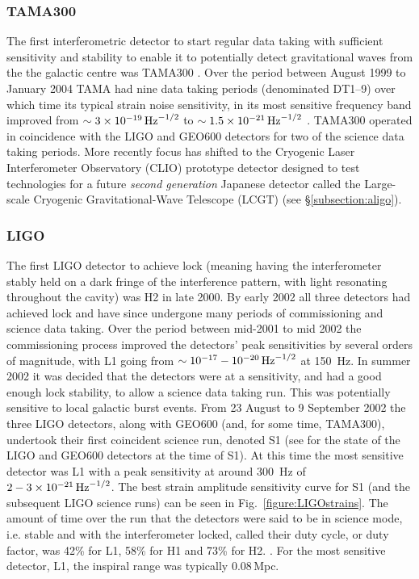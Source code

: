 \documentclass{article}
\begin{document}
\subsubsection{TAMA300}
The first interferometric detector to start regular data taking with sufficient
sensitivity and stability to enable it to potentially detect gravitational waves
from the the galactic centre was TAMA300 \cite{Ando:2001}. Over the period
between August 1999 to January 2004 TAMA had nine data taking periods
(denominated DT1--9) over which time its typical strain noise sensitivity, in
its most sensitive frequency band improved from $\sim3\times10^{-19}\,{\rm
Hz}^{-1/2}$ to $\sim1.5\times10^{-21}\,{\rm Hz}^{-1/2}$ \cite{Akutsu:2006}.
TAMA300 operated in coincidence with the LIGO and GEO600 detectors for two of
the science data taking periods. More recently focus has shifted to the
Cryogenic Laser Interferometer Observatory (CLIO) prototype detector
\cite{Yamamoto:2008, CLIOweb} designed to test technologies for a future {\it
second generation} Japanese detector called the Large-scale Cryogenic
Gravitational-Wave Telescope (LCGT) (see \S\ref{subsection:aligo}).

\subsubsection{LIGO}\label{sec:ligoruns}
The first LIGO detector to achieve lock (meaning having the interferometer
stably held on a dark fringe of the interference pattern, with light resonating
throughout the cavity) was H2 in late 2000. By early 2002 all three detectors
had achieved lock and have since undergone many periods of commissioning and
science data taking. Over the period between mid-2001 to mid 2002 the
commissioning process improved the detectors' peak sensitivities by several
orders of magnitude, with L1 going from $\sim10^{-17}-10^{-20}\,{\rm Hz}^{-1/2}$
at 150~Hz. In summer 2002 it was decided that the detectors were at a
sensitivity, and had a good enough lock stability, to allow a science data
taking run. This was potentially sensitive to local galactic burst events. From
23 August to 9 September 2002 the three LIGO detectors, along with GEO600 (and,
for some time, TAMA300), undertook their first coincident science run, denoted
S1 (see \cite{Abbott:2004a} for the state of the LIGO and GEO600 detectors at
the time of S1). At this time the most sensitive detector was L1 with a peak
sensitivity at around 300~Hz of $2-3\times10^{-21}\,{\rm Hz}^{-1/2}$. The best
strain amplitude sensitivity curve for S1 (and the subsequent LIGO science runs)
can be seen in Fig.~\ref{figure:LIGOstrains}. The amount of time over the run
that the detectors were said to be in science mode, i.e. stable and with the
interferometer locked, called their duty cycle, or duty factor, was 42\% for L1,
58\% for H1 and 73\% for H2. . For the most sensitive detector, L1, the inspiral
range was typically 0.08\,Mpc.
\end{document}
